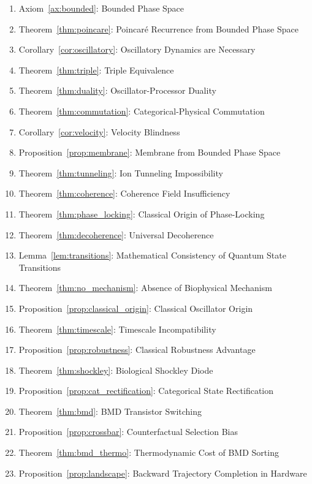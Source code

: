 \documentclass[12pt]{article}
\theoremstyle{definition}
\theoremstyle{remark}
\begin{document}
\begin{enumerate}
    \item Axiom~\ref{ax:bounded}: Bounded Phase Space
    \item Theorem~\ref{thm:poincare}: Poincar\'{e} Recurrence from Bounded Phase Space
    \item Corollary~\ref{cor:oscillatory}: Oscillatory Dynamics are Necessary
    \item Theorem~\ref{thm:triple}: Triple Equivalence
    \item Theorem~\ref{thm:duality}: Oscillator-Processor Duality
    \item Theorem~\ref{thm:commutation}: Categorical-Physical Commutation
    \item Corollary~\ref{cor:velocity}: Velocity Blindness
    \item Proposition~\ref{prop:membrane}: Membrane from Bounded Phase Space
    \item Theorem~\ref{thm:tunneling}: Ion Tunneling Impossibility
    \item Theorem~\ref{thm:coherence}: Coherence Field Insufficiency
    \item Theorem~\ref{thm:phase_locking}: Classical Origin of Phase-Locking
    \item Theorem~\ref{thm:decoherence}: Universal Decoherence
    \item Lemma~\ref{lem:transitions}: Mathematical Consistency of Quantum State Transitions
    \item Theorem~\ref{thm:no_mechanism}: Absence of Biophysical Mechanism
    \item Proposition~\ref{prop:classical_origin}: Classical Oscillator Origin
    \item Theorem~\ref{thm:timescale}: Timescale Incompatibility
    \item Proposition~\ref{prop:robustness}: Classical Robustness Advantage
    \item Theorem~\ref{thm:shockley}: Biological Shockley Diode
    \item Proposition~\ref{prop:cat_rectification}: Categorical State Rectification
    \item Theorem~\ref{thm:bmd}: BMD Transistor Switching
    \item Proposition~\ref{prop:crossbar}: Counterfactual Selection Bias
    \item Theorem~\ref{thm:bmd_thermo}: Thermodynamic Cost of BMD Sorting
    \item Proposition~\ref{prop:landscape}: Backward Trajectory Completion in Hardware

\end{enumerate}
\end{document}
